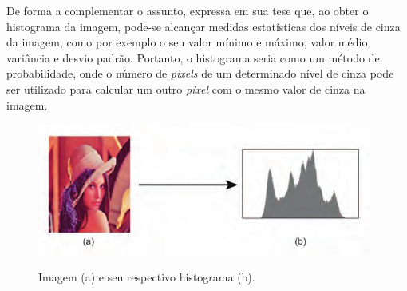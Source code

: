 De forma a complementar o assunto,  expressa em sua tese que, ao obter o histograma da imagem, pode-se alcançar medidas estatísticas dos níveis de cinza da imagem, como por exemplo o seu valor mínimo e máximo, valor médio, variância e desvio padrão. Portanto, o histograma seria como um método de probabilidade, onde o número de \textit{pixels} de um determinado nível de cinza pode ser utilizado para calcular um outro \textit{pixel} com o mesmo valor de cinza na imagem.

\begin{figure}[!htb]
\caption{ {\footnotesize Imagem (a) e seu respectivo histograma (b).}}
 
\centering %
\includegraphics[width=11cm]{revisao-bibliografica/Figuras/Histograma.png}%
\label{figura:figura7}

\centering {}
{
\label{figura:figura7}
}
\end{figure}